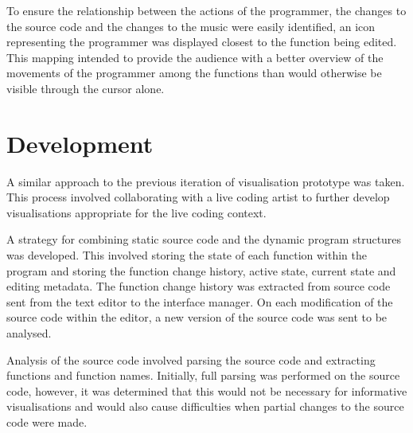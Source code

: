 To ensure the relationship between the actions of the programmer, the changes to the source code and the changes to the music were easily identified, an icon representing the programmer was displayed closest to the function being edited. This mapping intended to provide the audience with a better overview of the movements of the programmer among the functions than would otherwise be visible through the cursor alone.  

\section{Development}

A similar approach to the previous iteration of visualisation prototype was taken. This process involved collaborating with a live coding artist to further develop visualisations appropriate for the live coding context.

A strategy for combining static source code and the dynamic program structures was developed. This involved storing the state of each function within the program and storing the function change history, active state, current state and editing metadata. The function change history was extracted from source code sent from the text editor to the interface manager. On each modification of the source code within the editor, a new version of the source code was sent to be analysed.

Analysis of the source code involved parsing the source code and extracting functions and function names. Initially, full parsing was performed on the source code, however, it was determined that this would not be necessary for informative visualisations and would also cause difficulties when partial changes to the source code were made. 

\more





